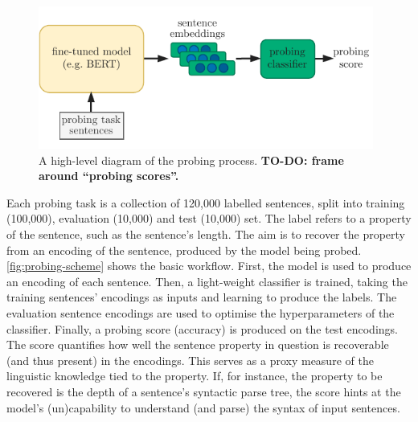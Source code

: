 \documentclass[bsc,frontabs,twoside,singlespacing,parskip,deptreport]{infthesis}
\begin{document}
{{    \begin{figure}[h!t]
      \centering
      \includegraphics[width=11cm]{graphics/probing-scheme}
      \caption{A high-level diagram of the probing process. \textbf{TO-DO: frame around ``probing scores''.}}
      \label{fig:probing-scheme}
    \end{figure}

    Each probing task is a collection of 120,000 labelled sentences, split into training (100,000), evaluation (10,000) and test (10,000) set. The label refers to a property of the sentence, such as the sentence's length. The aim is to recover the property from an encoding of the sentence, produced by the model being probed. \autoref{fig:probing-scheme} shows the basic workflow. First, the model is used to produce an encoding of each sentence. Then, a light-weight classifier is trained, taking the training sentences' encodings as inputs and learning to produce the labels. The evaluation sentence encodings are used to optimise the hyperparameters of the classifier. Finally, a probing score (accuracy) is produced on the test encodings. The score quantifies how well the sentence property in question is recoverable (and thus present) in the encodings. This serves as a proxy measure of the linguistic knowledge tied to the property. If, for instance, the property to be recovered is the depth of a sentence's syntactic parse tree, the score hints at the model's (un)capability to understand (and parse) the syntax of input sentences.

}}
\end{document}
